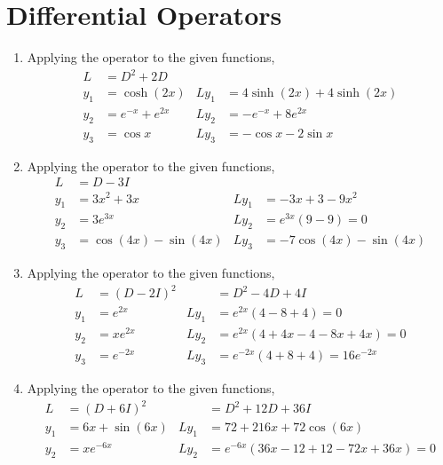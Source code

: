 \section{Differential Operators}

\begin{enumerate}
    \item Applying the operator to the given functions,
          \begin{align}
              L     & = D^{2} + 2D                                          \\
              y_{1} & = \cosh(2x)       & Ly_{1} & = 4\sinh(2x)+ 4\sinh(2x) \\
              y_{2} & = e^{-x} + e^{2x} & Ly_{2} & = -e^{-x} + 8e^{2x}      \\
              y_{3} & = \cos x          & Ly_{3} & = -\cos x - 2\sin x
          \end{align}

    \item Applying the operator to the given functions,
          \begin{align}
              L     & = D - 3I                                                       \\
              y_{1} & = 3x^{2} + 3x           & Ly_{1} & = -3x + 3 - 9x^{2}          \\
              y_{2} & = 3e^{3x}               & Ly_{2} & = e^{3x}(9 - 9) = 0         \\
              y_{3} & = \cos (4x) - \sin (4x) & Ly_{3} & = -7 \cos (4x)  - \sin (4x)
          \end{align}

    \item Applying the operator to the given functions,
          \begin{align}
              L     & = (D - 2I)^{2} &        & = D^{2} - 4D + 4I                  \\
              y_{1} & = e^{2x}       & Ly_{1} & = e^{2x} (4 - 8 + 4) = 0           \\
              y_{2} & = xe^{2x}      & Ly_{2} & = e^{2x}(4 + 4x - 4 - 8x + 4x) = 0 \\
              y_{3} & = e^{-2x}      & Ly_{3} & = e^{-2x}(4 + 8 + 4) = 16e^{-2x}
          \end{align}

    \item Applying the operator to the given functions,
          \begin{align}
              L     & = (D + 6I)^{2}  &        & = D^{2} + 12D + 36I                      \\
              y_{1} & = 6x + \sin(6x) & Ly_{1} & = 72 + 216x + 72\cos(6x)                 \\
              y_{2} & = xe^{-6x}      & Ly_{2} & = e^{-6x}(36x - 12 + 12 - 72x + 36x) = 0
          \end{align}


\end{enumerate}
